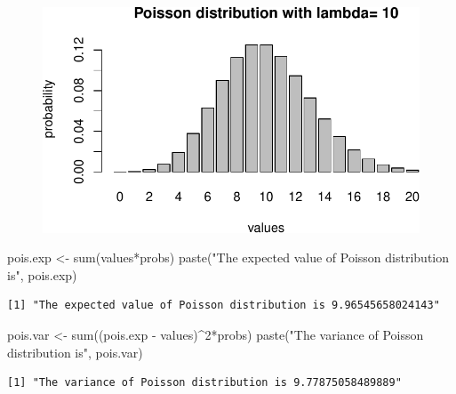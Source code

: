 \documentclass[
  letterpaper,
  DIV=11,
  numbers=noendperiod]{scrreprt}
\newenvironment{Shaded}{\begin{snugshade}}{\end{snugshade}}
\newcommand{\DecValTok}[1]{\textcolor[rgb]{0.68,0.00,0.00}{#1}}
\newcommand{\FunctionTok}[1]{\textcolor[rgb]{0.28,0.35,0.67}{#1}}
\newcommand{\NormalTok}[1]{\textcolor[rgb]{0.00,0.23,0.31}{#1}}
\newcommand{\OtherTok}[1]{\textcolor[rgb]{0.00,0.23,0.31}{#1}}
\newcommand{\SpecialCharTok}[1]{\textcolor[rgb]{0.37,0.37,0.37}{#1}}
\newcommand{\StringTok}[1]{\textcolor[rgb]{0.13,0.47,0.30}{#1}}
\begin{document}
\begin{figure}[H]

{\centering \includegraphics{./04-distributions_files/figure-pdf/unnamed-chunk-7-1.pdf}

}

\end{figure}

\begin{Shaded}
\begin{Highlighting}[]
\NormalTok{pois.exp }\OtherTok{\textless{}{-}} \FunctionTok{sum}\NormalTok{(values}\SpecialCharTok{*}\NormalTok{probs)}
\FunctionTok{paste}\NormalTok{(}\StringTok{"The expected value of Poisson distribution is"}\NormalTok{, pois.exp)}
\end{Highlighting}
\end{Shaded}

\begin{verbatim}
[1] "The expected value of Poisson distribution is 9.96545658024143"
\end{verbatim}

\begin{Shaded}
\begin{Highlighting}[]
\NormalTok{pois.var }\OtherTok{\textless{}{-}} \FunctionTok{sum}\NormalTok{((pois.exp }\SpecialCharTok{{-}}\NormalTok{ values)}\SpecialCharTok{\^{}}\DecValTok{2}\SpecialCharTok{*}\NormalTok{probs)}
\FunctionTok{paste}\NormalTok{(}\StringTok{"The variance of Poisson distribution is"}\NormalTok{, pois.var)}
\end{Highlighting}
\end{Shaded}

\begin{verbatim}
[1] "The variance of Poisson distribution is 9.77875058489889"
\end{verbatim}
\end{document}
